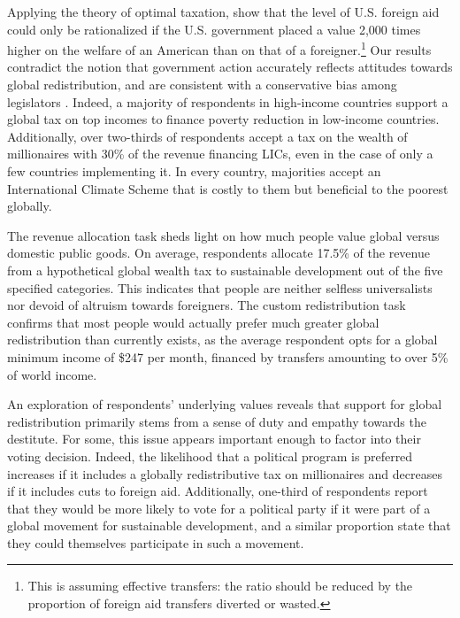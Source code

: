 \documentclass[12pt,english]{article}
\begin{document}
\begin{bibunit}
Applying the theory of optimal taxation, \cite{kopczuk_limitations_2005} show that the level of U.S. foreign aid could only be rationalized if the U.S. government placed a value 2,000 times higher on the welfare of an American than on that of a foreigner.\footnote{This is assuming effective transfers: the ratio should be reduced by the proportion of foreign aid transfers diverted or wasted.}
Our results contradict the notion that government action accurately reflects attitudes towards global redistribution, and are consistent with a conservative bias among legislators \citep{gilens_testing_2014,broockman_bias_2018,pilet_politicians_2024}.
Indeed, a majority of respondents in high-income countries support a global tax on top incomes to finance poverty reduction in low-income countries. Additionally, over two-thirds of respondents accept a tax on the wealth of millionaires with 30\% of the revenue financing LICs, even in the case of only a few countries implementing it. In every country, majorities accept an International Climate Scheme that is costly to them but beneficial to the poorest globally.

The revenue allocation task sheds light on how much people value global versus domestic public goods. On average, respondents allocate 17.5\% of the revenue from a hypothetical global wealth tax to sustainable development out of the five specified categories.
This indicates that people are neither selfless universalists %
nor devoid of altruism towards foreigners.
The custom redistribution task confirms that most people would actually prefer much greater global redistribution than currently exists, as the average respondent opts for a global minimum income of \$247 per month, financed by transfers amounting to over 5\% of world income.

An exploration of respondents' underlying values reveals that support for global redistribution primarily stems from a sense of duty and empathy towards the destitute. For some, this issue appears important enough to factor into their voting decision. Indeed, the likelihood that a political program is preferred increases if it includes a globally redistributive tax on millionaires and decreases if it includes cuts to foreign aid. Additionally, one-third of respondents report that they would be more likely to vote for a political party if it were part of a global movement for sustainable development, and a similar proportion state that they could themselves participate in such a movement.


\end{bibunit}
\end{document}
